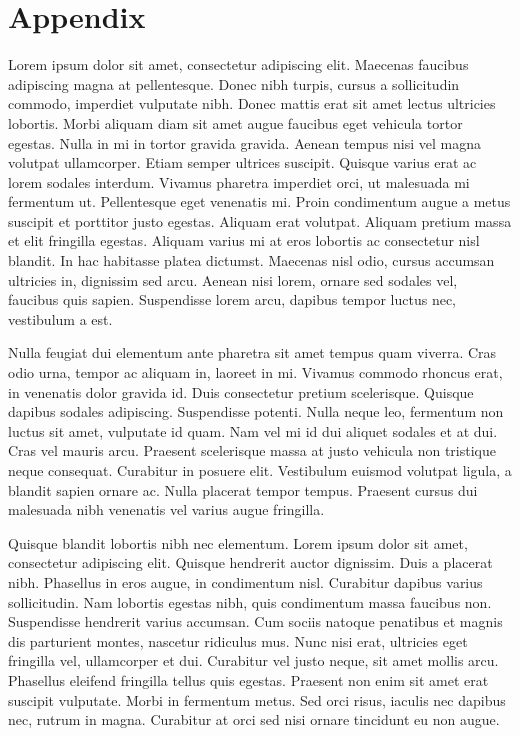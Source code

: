 \chapter{Appendix}\label{ch:appendix}
Lorem ipsum dolor sit amet, consectetur adipiscing elit. Maecenas faucibus adipiscing magna at pellentesque. Donec nibh turpis, cursus a sollicitudin commodo, imperdiet vulputate nibh. Donec mattis erat sit amet lectus ultricies lobortis. Morbi aliquam diam sit amet augue faucibus eget vehicula tortor egestas. Nulla in mi in tortor gravida gravida. Aenean tempus nisi vel magna volutpat ullamcorper. Etiam semper ultrices suscipit. Quisque varius erat ac lorem sodales interdum. Vivamus pharetra imperdiet orci, ut malesuada mi fermentum ut. Pellentesque eget venenatis mi. Proin condimentum augue a metus suscipit et porttitor justo egestas. Aliquam erat volutpat. Aliquam pretium massa et elit fringilla egestas. Aliquam varius mi at eros lobortis ac consectetur nisl blandit. In hac habitasse platea dictumst. Maecenas nisl odio, cursus accumsan ultricies in, dignissim sed arcu. Aenean nisi lorem, ornare sed sodales vel, faucibus quis sapien. Suspendisse lorem arcu, dapibus tempor luctus nec, vestibulum a est.

Nulla feugiat dui elementum ante pharetra sit amet tempus quam viverra. Cras odio urna, tempor ac aliquam in, laoreet in mi. Vivamus commodo rhoncus erat, in venenatis dolor gravida id. Duis consectetur pretium scelerisque. Quisque dapibus sodales adipiscing. Suspendisse potenti. Nulla neque leo, fermentum non luctus sit amet, vulputate id quam. Nam vel mi id dui aliquet sodales et at dui. Cras vel mauris arcu. Praesent scelerisque massa at justo vehicula non tristique neque consequat. Curabitur in posuere elit. Vestibulum euismod volutpat ligula, a blandit sapien ornare ac. Nulla placerat tempor tempus. Praesent cursus dui malesuada nibh venenatis vel varius augue fringilla.

Quisque blandit lobortis nibh nec elementum. Lorem ipsum dolor sit amet, consectetur adipiscing elit. Quisque hendrerit auctor dignissim. Duis a placerat nibh. Phasellus in eros augue, in condimentum nisl. Curabitur dapibus varius sollicitudin. Nam lobortis egestas nibh, quis condimentum massa faucibus non. Suspendisse hendrerit varius accumsan. Cum sociis natoque penatibus et magnis dis parturient montes, nascetur ridiculus mus. Nunc nisi erat, ultricies eget fringilla vel, ullamcorper et dui. Curabitur vel justo neque, sit amet mollis arcu. Phasellus eleifend fringilla tellus quis egestas. Praesent non enim sit amet erat suscipit vulputate. Morbi in fermentum metus. Sed orci risus, iaculis nec dapibus nec, rutrum in magna. Curabitur at orci sed nisi ornare tincidunt eu non augue.

